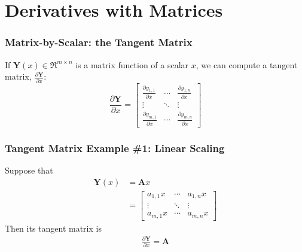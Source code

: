 \documentclass{beamer}
\begin{document}
\section{Derivatives with Matrices}
\setcounter{subsection}{1}

\begin{frame}
  \frametitle{Matrix-by-Scalar: the Tangent Matrix}

  If $\mathbf{Y}(x)\in\Re^{m\times n}$ is a matrix function of a scalar $x$,
  we can compute a tangent matrix,
  $\frac{\partial\mathbf{Y}}{\partial x}$:
  \begin{displaymath}
    \frac{\partial\mathbf{Y}}{\partial x} =
    \left[\begin{array}{ccc}
        \frac{\partial y_{1,1}}{\partial x}&\cdots&\frac{\partial y_{1,n}}{\partial x}\\
        \vdots&\ddots&\vdots\\
        \frac{\partial y_{m,1}}{\partial x}&\cdots&\frac{\partial y_{m,n}}{\partial x}
      \end{array}\right]
  \end{displaymath}
\end{frame}

\begin{frame}
  \frametitle{Tangent Matrix Example \#1: Linear Scaling}

  Suppose that
  \begin{align*}
    \mathbf{Y}(x) &= \mathbf{A}x\\
    &=\left[\begin{array}{ccc}
        a_{1,1}x&\cdots&a_{1,n}x\\
        \vdots&\ddots&\vdots\\
        a_{m,1}x&\cdots&a_{m,n}x
      \end{array}\right]
  \end{align*}
  Then its tangent matrix is
  \begin{align*}
    \frac{\partial\mathbf{Y}}{\partial x} =\mathbf{A}
  \end{align*}
\end{frame}
\end{document}
